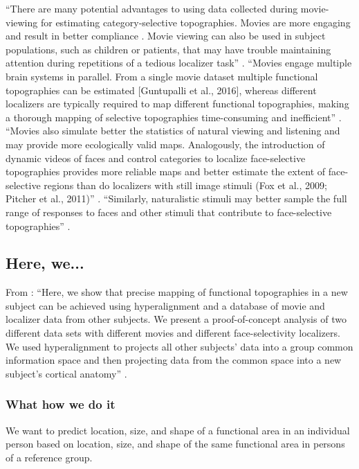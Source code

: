 %
``There are many potential advantages to using data collected during
movie-viewing for estimating category-selective topographies. Movies are more
engaging and result in better compliance \citep{vanderwal2015inscapes}. Movie
viewing can also be used in subject populations, such as children
\citep{richardson2018development} or patients, that may have trouble maintaining
attention during repetitions of a tedious localizer task''
\citep{jiahui2020predicting}.
%
``Movies engage multiple brain systems in parallel. From a single movie dataset
multiple functional topographies can be estimated [Guntupalli et al., 2016],
whereas different localizers are typically required to map different functional
topographies, making a thorough mapping of selective topographies time-consuming
and inefficient'' \citep{jiahui2020predicting}.
%
``Movies also simulate better the statistics of natural viewing and listening
and may provide more ecologically valid maps. Analogously, the introduction of
dynamic videos of faces and control categories to localize face-selective
topographies provides more reliable maps and better estimate the extent of
face-selective regions than do localizers with still image stimuli (Fox et al.,
2009; Pitcher et al., 2011)'' \citep{jiahui2020predicting}.
%
``Similarly, naturalistic stimuli may better sample the full range of responses
to faces and other stimuli that contribute to face-selective topographies''
\citep{jiahui2020predicting}.


\subsection{Here, we...}

From \citet{jiahui2020predicting}: ``Here, we show that precise mapping of
functional topographies in a new subject can be achieved using hyperalignment
and a database of movie and localizer data from other subjects.
%
We present a proof-of-concept analysis of two different data sets with different
movies and different face-selectivity localizers.
%
We used hyperalignment to projects all other subjects' data into a group common
information space and then projecting data from the common space into a new
subject's cortical anatomy'' \citep{jiahui2020predicting}.


\subsubsection{What how we do it}
We want to predict location, size, and shape of a functional area in
an individual person based on location, size, and shape of the same functional
area in persons of a reference group.


